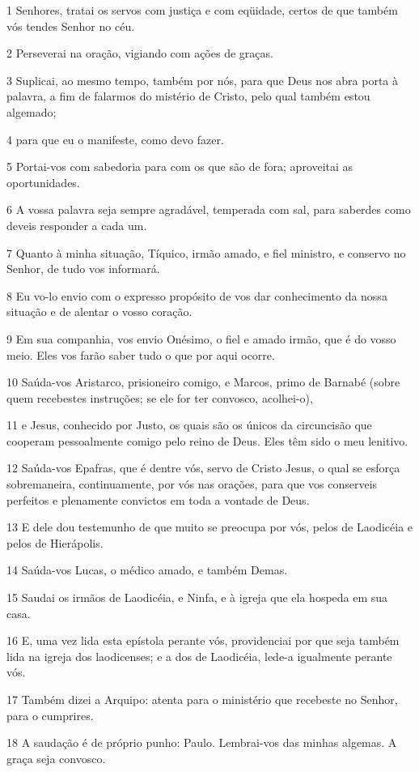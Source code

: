 \par 1 Senhores, tratai os servos com justiça e com eqüidade, certos de que também vós tendes Senhor no céu.
\par 2 Perseverai na oração, vigiando com ações de graças.
\par 3 Suplicai, ao mesmo tempo, também por nós, para que Deus nos abra porta à palavra, a fim de falarmos do mistério de Cristo, pelo qual também estou algemado;
\par 4 para que eu o manifeste, como devo fazer.
\par 5 Portai-vos com sabedoria para com os que são de fora; aproveitai as oportunidades.
\par 6 A vossa palavra seja sempre agradável, temperada com sal, para saberdes como deveis responder a cada um.
\par 7 Quanto à minha situação, Tíquico, irmão amado, e fiel ministro, e conservo no Senhor, de tudo vos informará.
\par 8 Eu vo-lo envio com o expresso propósito de vos dar conhecimento da nossa situação e de alentar o vosso coração.
\par 9 Em sua companhia, vos envio Onésimo, o fiel e amado irmão, que é do vosso meio. Eles vos farão saber tudo o que por aqui ocorre.
\par 10 Saúda-vos Aristarco, prisioneiro comigo, e Marcos, primo de Barnabé (sobre quem recebestes instruções; se ele for ter convosco, acolhei-o),
\par 11 e Jesus, conhecido por Justo, os quais são os únicos da circuncisão que cooperam pessoalmente comigo pelo reino de Deus. Eles têm sido o meu lenitivo.
\par 12 Saúda-vos Epafras, que é dentre vós, servo de Cristo Jesus, o qual se esforça sobremaneira, continuamente, por vós nas orações, para que vos conserveis perfeitos e plenamente convictos em toda a vontade de Deus.
\par 13 E dele dou testemunho de que muito se preocupa por vós, pelos de Laodicéia e pelos de Hierápolis.
\par 14 Saúda-vos Lucas, o médico amado, e também Demas.
\par 15 Saudai os irmãos de Laodicéia, e Ninfa, e à igreja que ela hospeda em sua casa.
\par 16 E, uma vez lida esta epístola perante vós, providenciai por que seja também lida na igreja dos laodicenses; e a dos de Laodicéia, lede-a igualmente perante vós.
\par 17 Também dizei a Arquipo: atenta para o ministério que recebeste no Senhor, para o cumprires.
\par 18 A saudação é de próprio punho: Paulo. Lembrai-vos das minhas algemas. A graça seja convosco.


